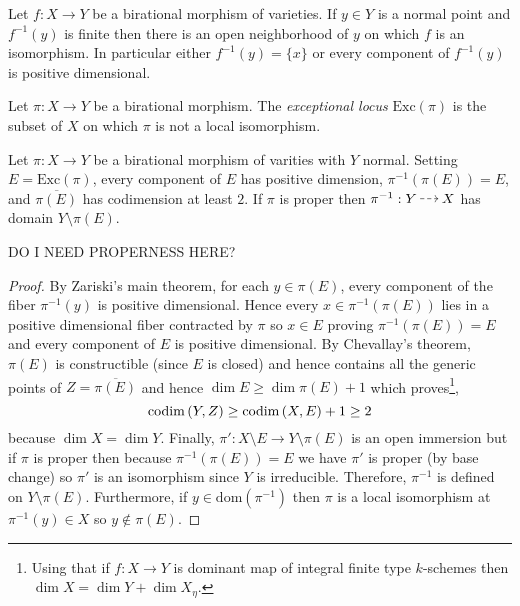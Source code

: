 \documentclass[12pt]{article}
\begin{document}
\newcommand{\Exc}[1]{\mathrm{Exc}\left(#1\right)}
\newcommand{\Ram}[1]{\mathrm{Ram}\left(#1\right)}

\begin{thm}[Zariski]
Let $f : X \to Y$ be a birational morphism of varieties. If $y \in Y$ is a normal point and $f^{-1}(y)$ is finite then there is an open neighborhood of $y$ on which $f$ is an isomorphism. In particular either $f^{-1}(y) = \{ x \}$ or every component of $f^{-1}(y)$ is positive dimensional.
\end{thm}

\begin{defn}
Let $\pi : X \to Y$ be a birational morphism. The \textit{exceptional locus} $\Exc{\pi}$ is the subset of $X$ on which $\pi$ is not a local isomorphism. 
\end{defn}

\begin{prop}
Let $\pi : X \to Y$ be a birational morphism of varities with $Y$ normal. Setting $E = \Exc{\pi}$, every component of $E$ has positive dimension, $\pi^{-1}(\pi(E)) = E$, and $\overline{\pi(E)}$ has codimension at least $2$. If $\pi$ is proper then $\pi^{-1} : Y \rat X$ has domain $Y \setminus \pi(E)$. 
\end{prop}

\begin{rmk}
DO I NEED PROPERNESS HERE?
\end{rmk}

\begin{proof}
By Zariski's main theorem, for each $y \in \pi(E)$, every component of the fiber $\pi^{-1}(y)$ is positive dimensional. Hence every $x \in \pi^{-1}(\pi(E))$ lies in a positive dimensional fiber contracted by $\pi$ so $x \in E$ proving $\pi^{-1}(\pi(E)) = E$ and every component of $E$ is positive dimensional. By Chevallay's theorem, $\pi(E)$ is constructible (since $E$ is closed) and hence contains all the generic points of $Z = \overline{\pi(E)}$ and hence $\dim{E} \ge \dim{\pi(E)} + 1$ which proves\footnote{Using that if $f : X \to Y$ is dominant map of integral finite type $k$-schemes then $\dim{X} = \dim{Y} + \dim{X_\eta}$.},
\[ \mathrm{codim}\left( Y, Z \right) \ge \mathrm{codim}\left( X, E \right) + 1 \ge 2 \]
because $\dim{X} = \dim{Y}$. Finally, $\pi' : X \setminus E \to Y \setminus \pi(E)$ is an open immersion but if $\pi$ is proper then because $\pi^{-1}(\pi(E)) = E$ we have $\pi'$ is proper (by base change) so $\pi'$ is an isomorphism since $Y$ is irreducible. Therefore, $\pi^{-1}$ is defined on $Y \setminus \pi(E)$. Furthermore, if $y \in \mathrm{dom}(\pi^{-1})$ then $\pi$ is a local isomorphism at  $\pi^{-1}(y) \in X$ so $y \notin \pi(E)$. 
\end{proof}
\end{document}
